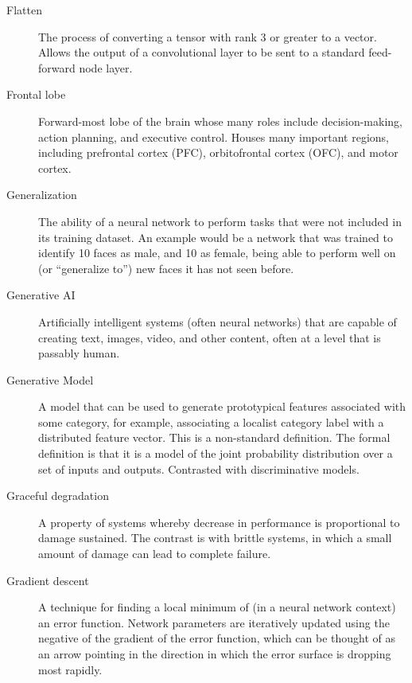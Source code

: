 \begin{description}
\item[Flatten] The process of converting a tensor with rank 3 or greater to a vector.  Allows the output of a convolutional layer to be sent to a standard feed-forward node layer.

\item[Frontal lobe] Forward-most lobe of the brain whose many roles include decision-making, action planning, and executive control. Houses many important regions, including prefrontal cortex (PFC), orbitofrontal cortex (OFC), and motor cortex. 


\item[Generalization] The ability of a neural network to perform tasks that were not included in its training dataset. An example would be a network that was trained to identify 10 faces as male, and 10 as female, being able to perform well on (or ``generalize to'') new faces it has not seen before.

\item[Generative AI] Artificially intelligent systems (often neural networks) that are capable of creating text, images, video, and other content, often at a level that is passably human.

\item[Generative Model] A model that can be used to generate prototypical features associated with some category, for example, associating a localist category label with a distributed feature vector. This is a non-standard definition. The formal definition is that it is a model of the joint probability distribution over a set of inputs and outputs. Contrasted with discriminative models. 

\item[Graceful degradation] A property of systems whereby decrease in performance is proportional to damage sustained. The contrast is with brittle systems, in which a small amount of damage can lead to complete failure.

\item[Gradient descent] A technique for finding a local minimum of (in a neural network context) an error function. Network parameters are iteratively updated using the negative of the gradient of the error function, which can be thought of as an arrow pointing in the direction in which the error surface is dropping most rapidly.



\end{description}
